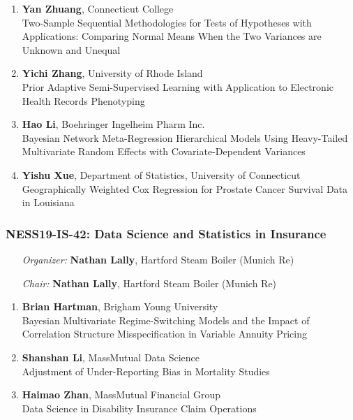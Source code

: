 \begin{enumerate}
\item \textbf{Yan Zhuang}, Connecticut College \\
Two-Sample Sequential Methodologies for Tests of Hypotheses with Applications: Comparing Normal Means When the Two Variances are Unknown and Unequal
\item \textbf{Yichi Zhang}, University of Rhode Island \\
Prior Adaptive Semi-Supervised Learning with Application to Electronic Health Records Phenotyping
\item \textbf{Hao Li}, Boehringer Ingelheim Pharm Inc. \\
Bayesian Network Meta-Regression Hierarchical Models Using Heavy-Tailed Multivariate Random Effects with Covariate-Dependent Variances
\item \textbf{Yishu Xue}, Department of Statistics, University of Connecticut \\
Geographically Weighted Cox Regression for Prostate Cancer Survival Data in Louisiana
\end{enumerate}

\subsubsection*{NESS19-IS-42: Data Science and Statistics in Insurance}

\begin{enumerate}[align=left]
\item [\emph{Organizer:}] \textbf{Nathan Lally}, Hartford Steam Boiler (Munich Re)
\item [\emph{Chair:}] \textbf{Nathan Lally}, Hartford Steam Boiler (Munich Re)
\end{enumerate}

\begin{enumerate}
\item \textbf{Brian Hartman}, Brigham Young University \\
Bayesian Multivariate Regime-Switching Models and the Impact of Correlation Structure Misspecification in Variable Annuity Pricing
\item \textbf{Shanshan Li}, MassMutual Data Science \\
Adjustment of Under-Reporting Bias in Mortality Studies
\item \textbf{Haimao Zhan}, MassMutual Financial Group \\
Data Science in Disability Insurance Claim Operations
\end{enumerate}

